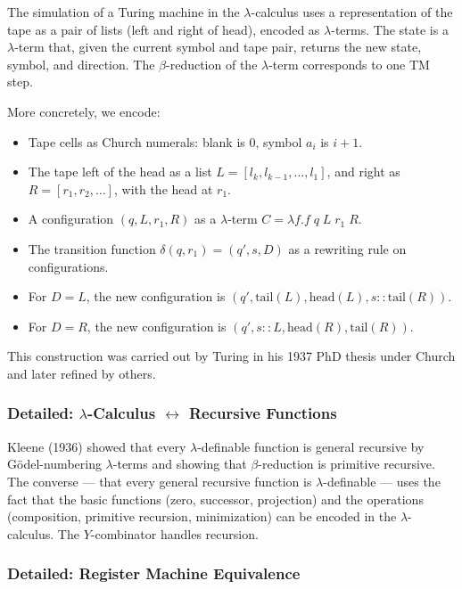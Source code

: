 The simulation of a Turing machine in the $\lambda$-calculus uses a representation of the tape as a pair of lists (left and right of head), encoded as $\lambda$-terms. The state is a $\lambda$-term that, given the current symbol and tape pair, returns the new state, symbol, and direction. The $\beta$-reduction of the $\lambda$-term corresponds to one TM step.

More concretely, we encode:
\begin{itemize}
\item Tape cells as Church numerals: blank is $0$, symbol $a_i$ is $i+1$.
\item The tape left of the head as a list $L = [l_k, l_{k-1}, \ldots, l_1]$, and right as $R = [r_1, r_2, \ldots]$, with the head at $r_1$.
\item A configuration $(q, L, r_1, R)$ as a $\lambda$-term $C = \lambda f. f\; q\; L\; r_1\; R$.
\item The transition function $\delta(q, r_1) = (q', s, D)$ as a rewriting rule on configurations.
\item For $D = L$, the new configuration is $(q', \text{tail}(L), \text{head}(L), s::\text{tail}(R))$.
\item For $D = R$, the new configuration is $(q', s::L, \text{head}(R), \text{tail}(R))$.
\end{itemize}

This construction was carried out by Turing in his 1937 PhD thesis under Church and later refined by others.

\subsubsection*{Detailed: $\lambda$-Calculus $\leftrightarrow$ Recursive Functions}

Kleene (1936) showed that every $\lambda$-definable function is general recursive by G\"odel-numbering $\lambda$-terms and showing that $\beta$-reduction is primitive recursive. The converse --- that every general recursive function is $\lambda$-definable --- uses the fact that the basic functions (zero, successor, projection) and the operations (composition, primitive recursion, minimization) can be encoded in the $\lambda$-calculus. The $Y$-combinator handles recursion.

\subsubsection*{Detailed: Register Machine Equivalence}

